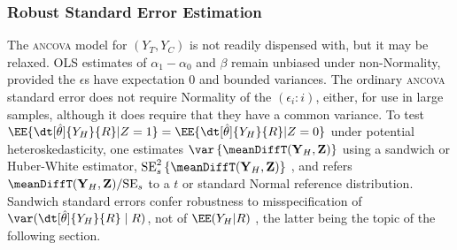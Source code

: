 \subsubsection{Robust Standard Error Estimation}\label{sec:sandwich}
The \textsc{ancova} model for $(Y_{T}, Y_{C})$ is not readily dispensed with, but it
may be relaxed.  OLS estimates of $\alpha_1-\alpha_{0}$ and
$\beta$ remain unbiased under non-Normality, provided
the $\epsilon$s have expectation 0 and bounded variances.  The
ordinary \textsc{ancova} standard error does not require Normality of
the $( \epsilon_{i}: i )$, either, for use in large samples, although
it does require that they have a common variance.
To test
$\EE\{ \dt[\hat\theta]{{Y_H}}{ R} | Z=1\} = \EE\{ \dt[\hat\theta]{{Y_H}}{
R} | Z=0\}$
under potential heteroskedasticity, one estimates
$\var\left\{\meanDiffT(\mathbf{Y}_H , \mathbf{Z})\right\}$
using a sandwich or Huber-White estimator,
$\mathrm{SE}_{s}^{2} \left\{ \meanDiffT(\mathbf{Y}_H , \mathbf{Z}) \right\}$
\citep{huber1967behavior,mackinnonWhite1985sandwichHC,longErvin2000sandwichHC,
bellmccaffrey2002sandwichSEs,pustejovskyTipton2017sandwichSEs}, %
and refers $\meanDiffT(\mathbf{Y}_H,\mathbf{Z})/\mathrm{SE}_{s}$
to a $t$ or standard Normal reference distribution.
Sandwich standard errors confer robustness to misspecification of
$\var(\dt[\hat\theta]{Y_{H}}{R}\mid  R)$, not of $\EE(Y_{H}| R)$
\citep{freedman2006sch}, the latter being the topic of
the following section.



